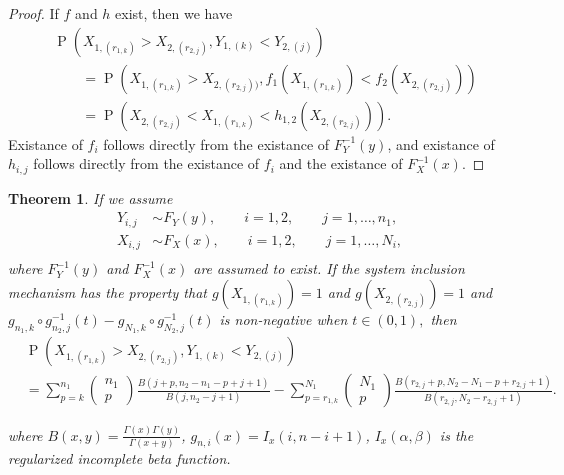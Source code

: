 \documentclass[12pt]{article}
\DeclareMathOperator*{\Prob}{P}
\newtheorem{theorem}{Theorem}[section]
\begin{document}
\begin{proof}
If $f$ and $h$ exist, then we have
\begin{align*}
  &\Prob\left(X_{1,(r_{1,k})} > X_{2,(r_{2,j})}, Y_{1,(k)} < Y_{2,(j)}\right) \\
  &\qquad= \Prob\left(X_{1,(r_{1,k})} > X_{2,(r_{2,j}))}, f_{1}(X_{1,(r_{1,k})}) < f_{2}(X_{2,(r_{2,j})})\right) \\
  &\qquad= \Prob\left( X_{2,(r_{2,j})} < X_{1,(r_{1,k})}  < h_{1,2}\left(X_{2,(r_{2,j})}\right)\right).
\end{align*}
Existance of $f_i$ follows directly from the existance of $F_Y^{-1}(y)$, and existance of $h_{i,j}$ follows directly from the existance of $f_i$ and the existance of $F_X^{-1}(x)$.
\end{proof}

\begin{theorem} \label{theorem:samedistgeneral}
If we assume 
\begin{align*}
  Y_{i,j} &\sim F_Y(y), \qquad i = 1,2, \qquad j = 1,\ldots,n_1, \\
  X_{i,j} &\sim F_X(x), \qquad i = 1,2, \qquad j = 1,\ldots,N_i, \\
\end{align*}
where $F_Y^{-1}(y)$ and $F_X^{-1}(x)$ are assumed to exist. If the system inclusion mechanism has the property that $g(X_{1,(r_{1,k})}) = 1$ and $g(X_{2,(r_{2,j})}) = 1$ and $g_{n_1, k} \circ g_{n_2, j}^{-1}(t) - g_{N_1, k} \circ g_{N_2, j}^{-1}(t)$ is non-negative when $t \in (0,1),$ then
\begin{align*}
	&\Prob\left(X_{1,(r_{1,k})} > X_{2,(r_{2,j})}, Y_{1,(k)} < Y_{2,(j)}\right) \\
  &= \sum_{p=k}^{n_1}\left(\begin{array}{l}
n_1 \\
p
\end{array}\right)\frac{B(j+p, n_2-n_1-p+j+1)}{B(j, n_2-j+1)} - \sum_{p=r_{1,k}}^{N_1}\left(\begin{array}{l}
N_1 \\
p
\end{array}\right)\frac{B(r_{2,j}+p, N_2-N_1-p+r_{2,j}+1)}{B(r_{2,j}, N_2-r_{2,j}+1)}.
\end{align*}

where $B(x, y) = \frac{\Gamma(x)\Gamma(y)}{\Gamma(x+y)}$, $g_{n,i}(x) = I_x(i, n-i+1)$, $I_x(\alpha, \beta)$ is the regularized incomplete beta function.

\end{theorem}
\end{document}
